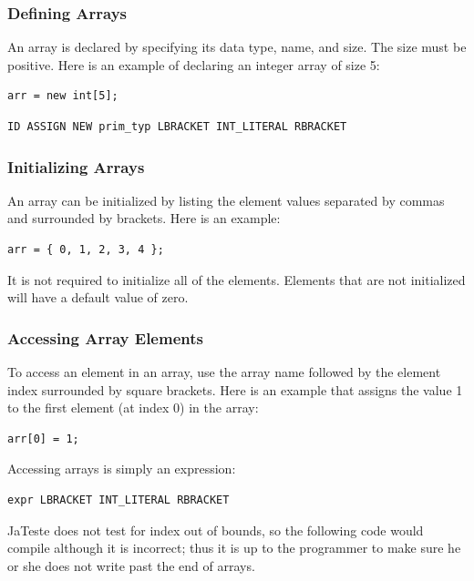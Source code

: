 \documentclass{article}
\begin{document}
\subsubsection{Defining Arrays}
An array is declared by specifying its data type, name, and size. The size must be positive. Here is an example of declaring an integer array of size 5:

 \begin{lstlisting}
arr = new int[5];
\end{lstlisting}

\begin{Verbatim}[frame=single]
ID ASSIGN NEW prim_typ LBRACKET INT_LITERAL RBRACKET
\end{Verbatim}

\subsubsection{Initializing Arrays}
An array can be initialized by listing the element values separated by commas and surrounded by brackets. Here is an example:

 \begin{lstlisting}
arr = { 0, 1, 2, 3, 4 };
\end{lstlisting}

It is not required to initialize all of the elements. Elements that are not initialized will have a default value of zero.

\subsubsection{Accessing Array Elements}
To access an element in an array, use the array name followed by the element index surrounded by square brackets. Here is an example that assigns the value 1 to the first element (at index 0) in the array:

 \begin{lstlisting}
arr[0] = 1;
\end{lstlisting}

Accessing arrays is simply an expression:
\begin{Verbatim}[frame=single]
 expr LBRACKET INT_LITERAL RBRACKET 
\end{Verbatim}


JaTeste does not test for index out of bounds, so the following code would compile although it is incorrect; thus it is up to the programmer to make sure he or she does not write past the end of arrays. 
\end{document}
